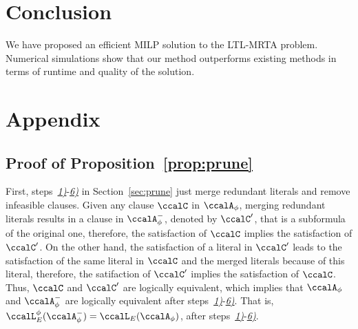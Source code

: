 \documentclass[Afour,sageh,times]{sagej}
\newcommand{\autop}{\ccalA_{\phi}}
\begin{document}
{{{\section{Conclusion}
We have proposed an efficient MILP solution to the LTL-MRTA problem. Numerical simulations show that our method outperforms existing methods in terms of runtime and quality of the solution.

\section{Appendix}\label{sec:appendix}
\subsection{Proof of Proposition~\ref{prop:prune}}\label{app:prune}
First, steps~\hyperref[prune:exclusion1]{\it 1)}-\hyperref[prune:violation2]{\it 6)} in Section~\ref{sec:prune} just merge redundant literals and remove infeasible clauses. Given any clause $\ccalC$ in $\autop$, merging redundant literals results in a clause in $\autop^-$, denoted by $\ccalC'$, that is a subformula of the original one, therefore, the satisfaction of $\ccalC$ implies the satisfaction of $\ccalC'$. On the other hand, the satisfaction of a literal in $\ccalC'$ leads to the satisfaction of the same literal in $\ccalC$ and the merged literals because of this literal, therefore, the satifaction of $\ccalC'$ implies the satisfaction of $\ccalC$. Thus, $\ccalC$ and $\ccalC'$ are logically equivalent, which implies that $\autop$ and $\autop^-$ are logically equivalent after steps~\hyperref[prune:exclusion1]{\it 1)}-\hyperref[prune:violation2]{\it 6)}. That is, $ \ccalL_E^\phi(\autop^-)= \ccalL_E(\autop)$,  after steps~\hyperref[prune:exclusion1]{\it 1)}-\hyperref[prune:violation2]{\it 6)}.


}}}
\end{document}
